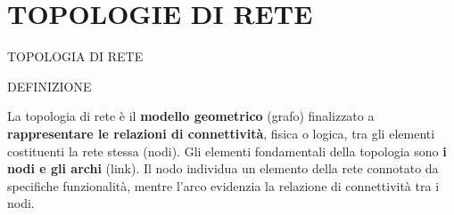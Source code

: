 \documentclass[aspectratio=1610]{beamer}
\begin{document}
\section{TOPOLOGIE DI RETE}

\begin{frame}{TOPOLOGIA DI RETE}
    \begin{alertblock}{DEFINIZIONE}
        \begin{minipage}{0.98\linewidth}
            \justifying
            La topologia di rete è il \textbf{modello geometrico} (grafo) finalizzato a \textbf{rappresentare 
            le relazioni di connettività}, fisica o logica, tra gli elementi costituenti la rete 
            stessa (nodi). Gli elementi fondamentali della topologia sono \textbf{i nodi e gli archi} (link). 
            Il nodo individua un elemento della rete connotato da specifiche funzionalità, 
            mentre l'arco evidenzia la relazione di connettività tra i nodi.
        \end{minipage}
    \end{alertblock}
\end{frame}
\end{document}
